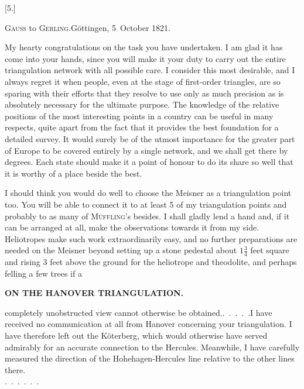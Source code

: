 \begin{center}
[5.]
\end{center}
\begin{center}
\textsc{Gauss} to \textsc{Gerling}.\quad Göttingen, 5~October 1821.
\end{center}

\par\noindent\hspace*{\parindent}My hearty congratulations on the task you have undertaken.
I am glad it has come into your hands, since you will make it your duty to carry out the entire triangulation network with all possible care.
I consider this most desirable, and I always regret it when people, even at the stage of first-order triangles, are so sparing with their efforts that they resolve to use only as much precision as is absolutely necessary for the ultimate purpose.
The  knowledge of the relative positions of the most interesting points in a country can be useful in many respects, quite apart from the fact that it provides the best foundation for a detailed survey.
It would surely be of the utmost importance for the greater part of Europe to be covered entirely by a single network, and we shall get there by degrees. Each state should make it a point of honour to do its share so well that it is worthy of a place beside the best.

\par\noindent\hspace*{\parindent}I should think you would do well to choose the Meisner as a triangulation point too. You will be able to connect it  to at least 5 of my triangulation points and probably to as many of \textsc{Müffling}'s besides.
I shall gladly lend a hand and, if it can be arranged at all, make the observations towards it from my side.
Heliotropes make such work extraordinarily easy, and no further preparations are needed on the Meisner beyond setting up a stone pedestal about \(1\frac{3}{4}\) feet square and rising 3 feet above the ground for the heliotrope and theodolite, and perhaps felling a few trees if a
\par\clearpage
\noindent\null\hfill{\small\textbf{ON THE HANOVER TRIANGULATION.}}\hfill{}\par\medskip
\noindent completely unobstructed view cannot otherwise be obtained.\quad\mbox{.\ .\ .\ .\ .}\quad I have received no communication at all from Hanover concerning your triangulation. I have therefore left out the Köterberg, which would otherwise have served admirably for an accurate connection to the Hercules.
Meanwhile, I have carefully measured the direction of the Hohehagen-Hercules line relative to the other lines there.\\
\mbox{.\ .\ .\ .\ .\ .}
